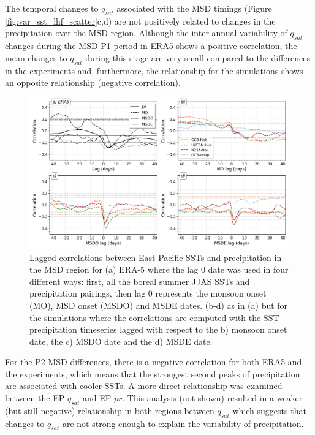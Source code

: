 The temporal changes to $q_{sat}$ associated with the MSD timings (Figure \ref{fig:var_sst_lhf_scatter}c,d) are not positively related to changes in the precipitation over the MSD region. Although the inter-annual variability of $q_{sat}$ changes during the MSD-P1  period in ERA5 shows a positive correlation, the mean changes to $q_{sat}$ during this stage are very small compared to the differences in the experiments and, furthermore, the relationship for the simulations shows an opposite relationship (negative correlation). 

\begin{figure}[t!]
\includegraphics[width=\linewidth]{figures/sst_regg.png}
\caption[Lagged correlations of East Pacific SSTs]{Lagged correlations between East Pacific SSTs and precipitation in the MSD region for (a) ERA-5 where the lag 0 date was used in four different ways: first, all the boreal summer JJAS SSTs and precipitation pairings, then lag 0 represents the monsoon onset (MO), MSD onset (MSDO) and MSDE dates. (b-d) as in (a) but for the simulations where the correlations are computed with the SST-precipitation timeseries lagged with respect to the b) monsoon onset date, the c) MSDO date and the d) MSDE date.   }
\label{fig:sst_lag}
\end{figure}

For the P2-MSD differences, there is a negative correlation for both ERA5 and the experiments, which means that the strongest second peaks of precipitation are associated with cooler SSTs.  
A more direct relationship was examined between the EP $q_{sat}$ and EP $pr$. This analysis (not shown) resulted in a weaker (but still negative) relationship in both regions between $q_{sat}$ which suggests that changes to $q_{sat}$ are not strong enough to explain the variability of precipitation. 

